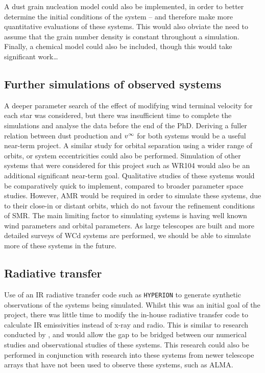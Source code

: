A dust grain nucleation model could also be implemented, in order to better determine the initial conditions of the system -- and therefore make more quantitative evaluations of these systems.
This would also obviate the need to assume that the grain number density is constant throughout a simulation.
Finally, a chemical model could also be included, though this would take significant work\ldots

\subsection{Further simulations of observed systems}

A deeper parameter search of the effect of modifying wind terminal velocity for each star was considered, but there was insufficient time to complete the simulations and analyse the data before the end of the PhD.
Deriving a fuller relation between dust production and $v^\infty$ for both systems would be a useful near-term project.
A similar study for orbital separation using a wider range of orbits, or system eccentricities could also be performed.
Simulation of other systems that were considered for this project such as WR104 would also be an additional significant near-term goal.
Qualitative studies of these systems would be comparatively quick to implement, compared to broader parameter space studies.
However, AMR would be required in order to simulate these systems, due to their close-in or distant orbits, which do not favour the refinement conditions of SMR.
The main limiting factor to simulating systems is having well known wind parameters and orbital parameters.
As large telescopes are built and more detailed surveys of WCd systems are performed, we should be able to simulate more of these systems in the future.

\subsection{Radiative transfer}

Use of an IR radiative transfer code such as \texttt{HYPERION} \parencite{robitailleHYPERIONOpensourceParallelized2011} to generate synthetic observations of the systems being simulated.
Whilst this was an initial goal of the project, there was little time to modify the in-house radiative transfer code to calculate IR emissivities instead of x-ray and radio.
This is similar to research conducted by \textcite{hendrix_pinwheels_2016}, and would allow the gap to be bridged between our numerical studies and observational studies of these systems.
This research could also be performed in conjunction with research into these systems from newer telescope arrays that have not been used to observe these systems, such as ALMA.

